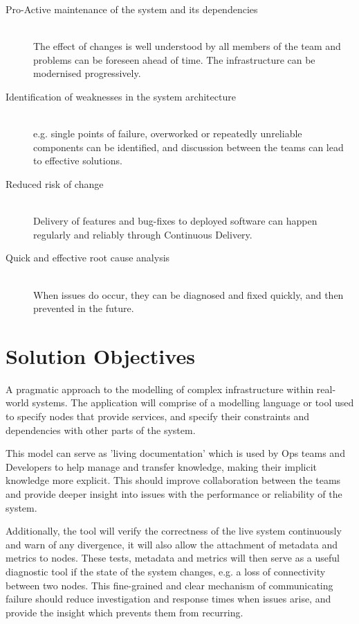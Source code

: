 \documentclass{cshonours}
\begin{document}
\begin{description}
  \item [Pro-Active maintenance of the system and its dependencies]\hfill \\
    The effect of changes is well understood by all members of the team and problems can be foreseen ahead of time. The infrastructure can be modernised progressively. 
  \item [Identification of weaknesses in the system architecture]\hfill \\
    e.g. single points of failure, overworked or repeatedly unreliable components can be identified, and discussion between the teams can lead to effective solutions. 
  \item [Reduced risk of change]\hfill \\
    Delivery of features and bug-fixes to deployed software can happen regularly and reliably through Continuous Delivery. 
  \item [Quick and effective root cause analysis]\hfill \\
    When issues do occur, they can be diagnosed and fixed quickly, and then prevented in the future.
\end{description}

\section{Solution Objectives}

A pragmatic approach to the modelling of complex infrastructure within real-world systems. The application will comprise of a modelling language or tool used to specify nodes that provide services, and specify their constraints and dependencies with other parts of the system.

This model can serve as 'living documentation' which is used by Ops teams and Developers to help manage and transfer knowledge, making their implicit knowledge more explicit. This should improve collaboration between the teams and provide deeper insight into issues with the performance or reliability of the system.

Additionally, the tool will verify the correctness of the live system continuously and warn of any divergence, it will also allow the attachment of metadata and metrics to nodes. These tests, metadata and metrics will then serve as a useful diagnostic tool if the state of the system changes, e.g. a loss of connectivity between two nodes. This fine-grained and clear mechanism of communicating failure should reduce investigation and response times when issues arise, and provide the insight which prevents them from recurring.
\end{document}
